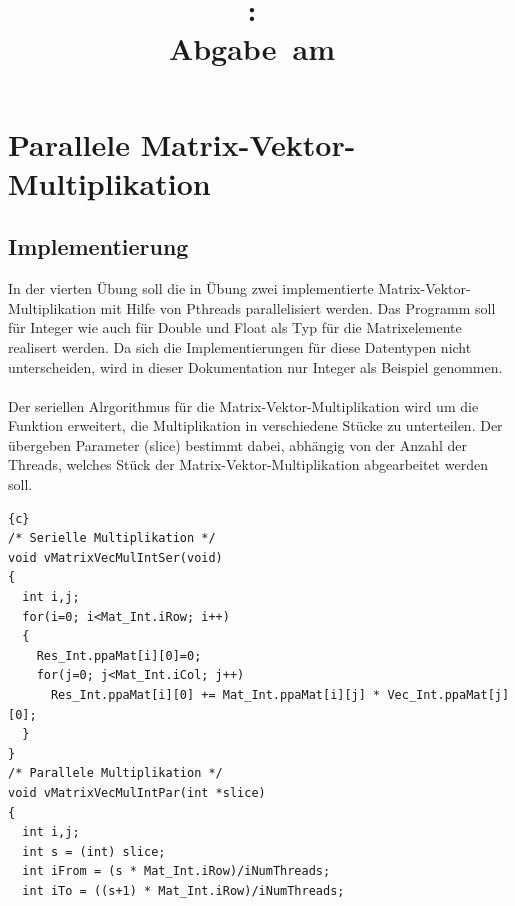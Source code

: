 \documentclass{article}
\title{
\vspace{2in}
\textmd{\textbf{\hmwkClass:\ \hmwkTitle}}\\
\normalsize\vspace{0.1in}\small{Abgabe\ am\ \hmwkDueDate}\\
\vspace{0.1in}\large{\textit{\hmwkClassTime}}
\vspace{3in}
}
\author{\textbf{\hmwkAuthorName}}
\date{} %
\newcommand{\enterProblemHeader}[1]{
}
\newcommand{\exitProblemHeader}[1]{
}
\newcounter{homeworkProblemCounter} %
\newcommand{\homeworkProblemName}{}
\newenvironment{homeworkProblem}[1][Problem \arabic{homeworkProblemCounter}]{ %
\stepcounter{homeworkProblemCounter} %
\renewcommand{\homeworkProblemName}{#1} %
\section{\homeworkProblemName} %
}{
}
\begin{document}
\maketitle
\newpage
\tableofcontents
\newpage
\begin{homeworkProblem}[Parallele Matrix-Vektor-Multiplikation]
\subsection{Implementierung}
In der vierten Übung soll die in Übung zwei implementierte Matrix-Vektor-Multiplikation
mit Hilfe von Pthreads parallelisiert werden. Das Programm soll für Integer wie auch
für Double und Float als Typ für die Matrixelemente realisert werden. Da sich die 
Implementierungen für diese Datentypen nicht unterscheiden, wird in dieser Dokumentation
nur Integer als Beispiel genommen.
\\\\
Der seriellen Alrgorithmus für die Matrix-Vektor-Multiplikation wird um die Funktion 
erweitert, die Multiplikation in verschiedene Stücke zu unterteilen. Der 
übergeben Parameter (slice) bestimmt dabei, abhängig von der Anzahl der Threads, welches
Stück der Matrix-Vektor-Multiplikation abgearbeitet werden soll.
\begin{lstlisting}{c}
/* Serielle Multiplikation */
void vMatrixVecMulIntSer(void)
{
  int i,j;
  for(i=0; i<Mat_Int.iRow; i++)
  {
    Res_Int.ppaMat[i][0]=0;
    for(j=0; j<Mat_Int.iCol; j++)
      Res_Int.ppaMat[i][0] += Mat_Int.ppaMat[i][j] * Vec_Int.ppaMat[j][0];
  }
}
/* Parallele Multiplikation */
void vMatrixVecMulIntPar(int *slice)
{
  int i,j;
  int s = (int) slice;
  int iFrom = (s * Mat_Int.iRow)/iNumThreads;
  int iTo = ((s+1) * Mat_Int.iRow)/iNumThreads;
  

\end{lstlisting}
\end{homeworkProblem}
\end{document}
